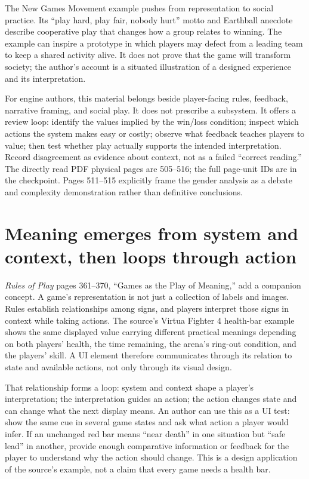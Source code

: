 The New Games Movement example pushes from representation to social practice. Its ``play hard, play fair, nobody hurt'' motto and Earthball anecdote describe cooperative play that changes how a group relates to winning. The example can inspire a prototype in which players may defect from a leading team to keep a shared activity alive. It does not prove that the game will transform society; the author's account is a situated illustration of a designed experience and its interpretation.

For engine authors, this material belongs beside player-facing rules, feedback, narrative framing, and social play. It does not prescribe a subsystem. It offers a review loop: identify the values implied by the win/loss condition; inspect which actions the system makes easy or costly; observe what feedback teaches players to value; then test whether play actually supports the intended interpretation. Record disagreement as evidence about context, not as a failed ``correct reading.'' The directly read PDF physical pages are 505--516; the full page-unit IDs are in the checkpoint. Pages 511--515 explicitly frame the gender analysis as a debate and complexity demonstration rather than definitive conclusions.

\section{Meaning emerges from system and context, then loops through action}\label{06-engine-ii-ch046-meaning-emerges-from-system-and-context-then-loops-through-action}

\hypertarget{06-engine-ii-ch046-meaning-emerges-from-system-and-context-then-loops-through-action}{}

\emph{Rules of Play} pages 361--370, ``Games as the Play of Meaning,'' add a companion concept. A game's representation is not just a collection of labels and images. Rules establish relationships among signs, and players interpret those signs in context while taking actions. The source's Virtua Fighter 4 health-bar example shows the same displayed value carrying different practical meanings depending on both players' health, the time remaining, the arena's ring-out condition, and the players' skill. A UI element therefore communicates through its relation to state and available actions, not only through its visual design.

That relationship forms a loop: system and context shape a player's interpretation; the interpretation guides an action; the action changes state and can change what the next display means. An author can use this as a UI test: show the same cue in several game states and ask what action a player would infer. If an unchanged red bar means ``near death'' in one situation but ``safe lead'' in another, provide enough comparative information or feedback for the player to understand why the action should change. This is a design application of the source's example, not a claim that every game needs a health bar.

